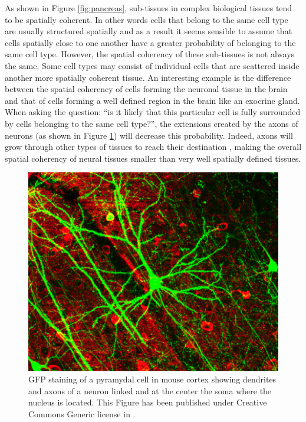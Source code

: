      
    As shown in Figure \ref{fig:pancreas}, sub-tissues in complex biological tissues tend to be spatially coherent. In other words cells that belong to the same cell type are usually structured spatially and as a result it seems sensible to assume that cells spatially close to one another have a greater probability of belonging to the same cell type. However, the spatial coherency of these sub-tissues is not always the same. Some cell types may consist of individual cells that are scattered inside another more spatially coherent tissue. An interesting example is the difference between the spatial coherency of cells forming the neuronal tissue in the brain and that of cells forming a well defined region in the brain like an exocrine gland. When asking the question: ``is it likely that this particular cell is fully surrounded by cells belonging to the same cell type?'', the extensions created by the axons of neurons (as shown in Figure \ref{fig:neuron}) will decrease this probability. Indeed, axons will grow through other types of tissues to reach their destination \citep{bartlett84,colello90}, making the overall spatial coherency of neural tissues smaller than very well spatially defined tissues.\\
    
\begin{figure}[bth]
\begin{center}
  \includegraphics[width=0.8\linewidth]{gfx/chapter1/neuron.png}
\end{center}
  \caption{GFP staining of a pyramydal cell in mouse cortex showing dendrites and axons of a neuron linked and at the center the soma where the nucleus is located. This Figure has been published under Creative Commons Generic license in \citep{lee06}.}
  \label{fig:neuron}
\end{figure}
	
